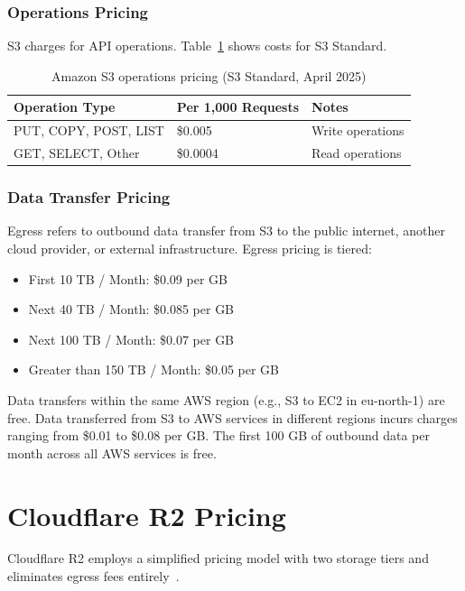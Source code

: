 \subsubsection{Operations Pricing} 
S3 charges for API operations. Table~\ref{tab:s3-operations-pricing} shows costs for S3 Standard.

\begin{table}[H]
\centering
\caption{Amazon S3 operations pricing (S3 Standard, April 2025)}
\label{tab:s3-operations-pricing}
\begin{tabular}{p{5cm}p{4.5cm}p{4.5cm}}
\hline
\textbf{Operation Type} & \textbf{Per 1,000 Requests} & \textbf{Notes} \\
\hline
PUT, COPY, POST, LIST & \$0.005 & Write operations \\
GET, SELECT, Other & \$0.0004 & Read operations \\
\hline
\end{tabular}
\end{table}

\subsubsection{Data Transfer Pricing} 
Egress refers to outbound data transfer from S3 to the public internet, another cloud provider, or external infrastructure. Egress pricing is tiered:

\begin{itemize}
    \item First 10 TB / Month: \$0.09 per GB
    \item Next 40 TB / Month: \$0.085 per GB
    \item Next 100 TB / Month: \$0.07 per GB
    \item Greater than 150 TB / Month: \$0.05 per GB
\end{itemize}

Data transfers within the same AWS region (e.g., S3 to EC2 in eu-north-1) are free. Data transferred from S3 to AWS services in different regions incurs charges ranging from \$0.01 to \$0.08 per GB. The first 100 GB of outbound data per month across all AWS services is free.

\section{Cloudflare R2 Pricing}\label{sec:r2-pricing}

Cloudflare R2 employs a simplified pricing model with two storage tiers and eliminates egress fees entirely~\cite{cloudflare-r2-pricing}.


